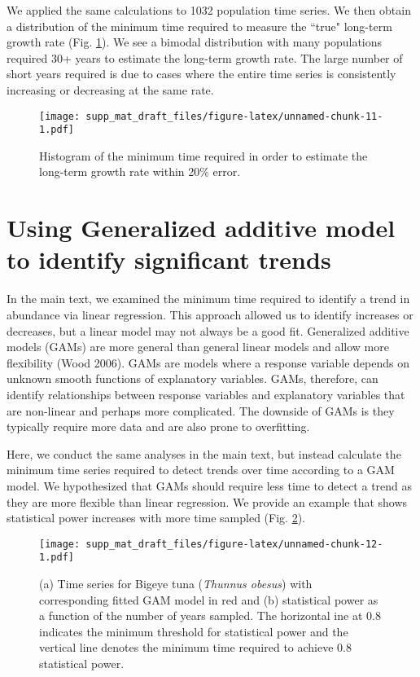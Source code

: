 \documentclass[12pt,]{article}
\begin{document}
We applied the same calculations to 1032 population time series. We then
obtain a distribution of the minimum time required to measure the
``true" long-term growth rate (Fig. \ref{fig:min_time_growth_dist}). We
see a bimodal distribution with many populations required 30+ years to
estimate the long-term growth rate. The large number of short years
required is due to cases where the entire time series is consistently
increasing or decreasing at the same rate.

\begin{figure}[htbp]
\centering
\texttt{[image: supp\_mat\_draft\_files/figure-latex/unnamed-chunk-11-1.pdf]}
\caption{Histogram of the minimum time required in order to estimate the
long-term growth rate within 20\%
error.\label{fig:min_time_growth_dist}}
\end{figure}

\clearpage 

\section{Using Generalized additive model to identify significant
trends}\label{using-generalized-additive-model-to-identify-significant-trends}

In the main text, we examined the minimum time required to identify a
trend in abundance via linear regression. This approach allowed us to
identify increases or decreases, but a linear model may not always be a
good fit. Generalized additive models (GAMs) are more general than
general linear models and allow more flexibility (Wood 2006). GAMs are
models where a response variable depends on unknown smooth functions of
explanatory variables. GAMs, therefore, can identify relationships
between response variables and explanatory variables that are non-linear
and perhaps more complicated. The downside of GAMs is they typically
require more data and are also prone to overfitting.

Here, we conduct the same analyses in the main text, but instead
calculate the minimum time series required to detect trends over time
according to a GAM model. We hypothesized that GAMs should require less
time to detect a trend as they are more flexible than linear regression.
We provide an example that shows statistical power increases with more
time sampled (Fig. \ref{fig:gam_example}).

\begin{figure}[htbp]
\centering
\texttt{[image: supp\_mat\_draft\_files/figure-latex/unnamed-chunk-12-1.pdf]}
\caption{(a) Time series for Bigeye tuna (\emph{Thunnus obesus}) with
corresponding fitted GAM model in red and (b) statistical power as a
function of the number of years sampled. The horizontal ine at 0.8
indicates the minimum threshold for statistical power and the vertical
line denotes the minimum time required to achieve 0.8 statistical
power.\label{fig:gam_example}}
\end{figure}
\end{document}
